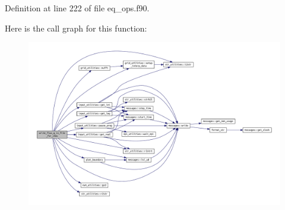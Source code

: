 Definition at line 222 of file eq\+\_\+ops.\+f90.

Here is the call graph for this function\+:
\nopagebreak
\begin{figure}[H]
\begin{center}
\leavevmode
\includegraphics[width=350pt]{eq__ops_8f90_aecc1d4103aa82217d3014ebb09d7f1e5_cgraph}
\end{center}
\end{figure}
